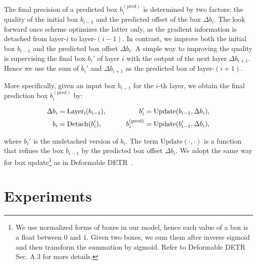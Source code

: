 \documentclass[runningheads]{llncs}
\begin{document}
The final precision of a predicted box $b_{i}^{(\mathrm{pred})}$ is determined by two factors: the quality of the initial box $b_{i-1}$ and the predicted offset of the box $\Delta b_i$. The look forward once scheme optimizes the latter only, as the gradient information is detached from layer-$i$ to layer-$(i-1)$. In contrast, we improve both the initial box $b_{i-1}$ and the predicted box offset $\Delta b_i$. A simple way to improving the quality is supervising the final box $b_i'$ of layer $i$ with the output of the next layer $\Delta b_{i+1}$. Hence we use the sum of $b_i'$ and $\Delta b_{i+1}$ as the predicted box of layer-$(i+1)$.

More specifically, given an input box $b_{i-1}$ for the $i$-th layer, we obtain the final prediction box  $b_{i}^{(\mathrm{pred})}$ by:


\begin{equation}
\vspace{-0.1cm}
\begin{aligned} 
     \Delta b_{i} &= \mathrm{Layer_{i}}(b_{i-1}), \quad\quad
     &b_{i}' &= \mathrm{Update}(b_{i-1}, \Delta b_{i}), \\
     b_{i} &= \mathrm{Detach}(b_{i}'), \quad\quad
     &b_{i}^{(\mathrm{pred})} &= \mathrm{Update}(b_{i-1}', \Delta b_{i}),
\end{aligned}
\end{equation}

\noindent
where $b_{i}'$ is the undetached version of $b_{i}$. The term $\mathrm{Update}(\cdot,\cdot)$ is a function that refines the box $b_{i-1}$ by the predicted box offset $\Delta b_{i}$. We adopt the same way for box update\footnote{We use normalized forms of boxes in our model, hence each value of a box is a float between $0$ and $1$. Given two boxes, we sum them after inverse sigmoid and then transform the summation by sigmoid. Refer to Deformable DETR~\cite{zhu2020deformable} Sec. A.3 for more details.} as in Deformable DETR~\cite{zhu2020deformable}. 

\section{Experiments}
\end{document}

